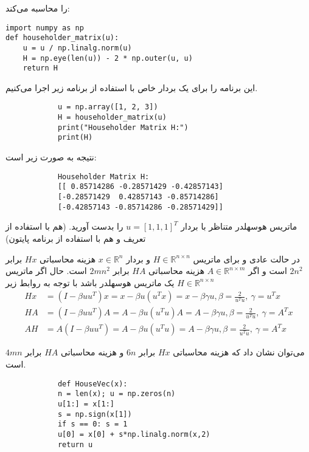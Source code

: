 را محاسبه می‌کند:
\begin{code}
\begin{latin}
\begin{lstlisting}
import numpy as np  
def householder_matrix(u):  
	u = u / np.linalg.norm(u)
	H = np.eye(len(u)) - 2 * np.outer(u, u)  
	return H  
\end{lstlisting}
\end{latin}
\end{code}
این برنامه را برای یک بردار خاص با استفاده از برنامه زیر اجرا می‌کنیم.
\begin{code}
	\begin{latin}
		\begin{lstlisting}
			u = np.array([1, 2, 3])  
			H = householder_matrix(u)  
			print("Householder Matrix H:")  
			print(H)
		\end{lstlisting}
	\end{latin}
\end{code}
نتیجه به صورت زیر است:
\begin{code}
	\begin{latin}
		\begin{lstlisting}
			Householder Matrix H:
			[[ 0.85714286 -0.28571429 -0.42857143]
			[-0.28571429  0.42857143 -0.85714286]
			[-0.42857143 -0.85714286 -0.28571429]]
		\end{lstlisting}
	\end{latin}
\end{code}
\begin{exercise}
	ماتریس هوسهلدر متناظر با بردار
	$u=[1, 1, 1]^T$
	را بدست آورید. (هم با استفاده از تعریف و هم با استفاده از برنامه پایتون)
\end{exercise}
\begin{nokteh}
	در حالت عادی و برای ماتریس
	$H\in \mathbb{R}^{n\times n}$
	و بردار
	$x\in \mathbb{R}^n$
	هزینه محاسباتی
	$Hx$
	برابر 
	$2n^2$
	است و اگر
	$A\in \mathbb{R}^{n\times m}$
	هزینه محاسباتی 
	$HA$
	برابر 
	$2mn^2$
	است.
	حال اگر ماتریس 
	$H\in \mathbb{R}^{n\times n}$
	یک ماتریس هوسهلدر باشد با توجه به روابط زیر
	\begin{align*}
		Hx &=(I-\beta u u^T)x=x-\beta u (u^T x) = x - \beta \gamma u, \beta = \frac{2}{u^Tu}, ~ \gamma = u^Tx\\
		HA &=(I-\beta u u^T)A=A-\beta u (u^T u)A = A - \beta \gamma u, \beta = \frac{2}{u^Tu}, ~ \gamma = A^Tx\\
		AH &=A(I-\beta u u^T)=A-\beta u (u^T u) = A - \beta \gamma u, \beta = \frac{2}{u^Tu}, ~ \gamma = A^Tx
	\end{align*}
	
	
	می‌توان نشان داد که هزینه محاسباتی
	$Hx$
	برابر 
	$6n$
	و هزینه محاسباتی 
	$HA$
	برابر 
	$4mn$
	است.
\end{nokteh}
\begin{code}
	\begin{latin}
		\begin{lstlisting}
			def HouseVec(x):
			n = len(x); u = np.zeros(n)
			u[1:] = x[1:]
			s = np.sign(x[1])
			if s == 0: s = 1
			u[0] = x[0] + s*np.linalg.norm(x,2)
			return u
		\end{lstlisting}
	\end{latin}
\end{code}

